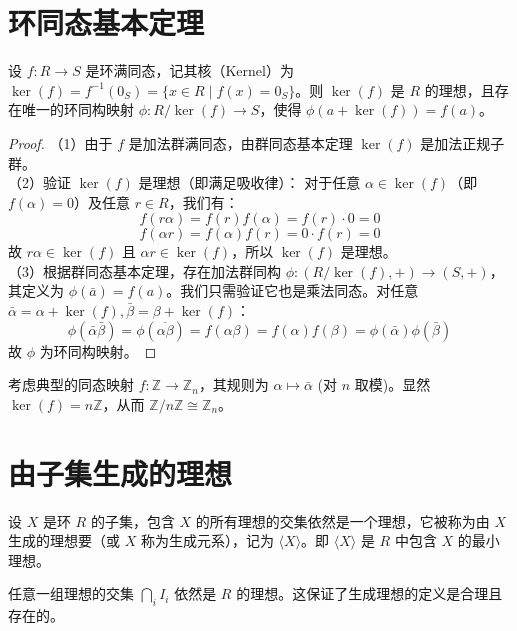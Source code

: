 \documentclass[11pt]{article}
\begin{document}
\section{环同态基本定理}

\begin{cntheorem}
设 $f: R \to S$ 是环满同态，记其核（Kernel）为 $\ker(f) = f^{-1}(0_S) = \{x \in R \mid f(x) = 0_S\}$。则 $\ker(f)$ 是 $R$ 的理想，且存在唯一的环同构映射 $\phi: R/\ker(f) \to S$，使得 $\phi(a + \ker(f)) = f(a)$。
\end{cntheorem}
\begin{proof}
（1）由于 $f$ 是加法群满同态，由群同态基本定理 $\ker(f)$ 是加法正规子群。\\
（2）验证 $\ker(f)$ 是理想（即满足吸收律）： 对于任意 $\alpha \in \ker(f)$（即 $f(\alpha)=0$）及任意 $r \in R$，我们有：
$$ f(r\alpha) = f(r)f(\alpha) = f(r) \cdot 0 = 0 $$
$$ f(\alpha r) = f(\alpha)f(r) = 0 \cdot f(r) = 0 $$
故 $r\alpha \in \ker(f)$ 且 $\alpha r \in \ker(f)$，所以 $\ker(f)$ 是理想。\\
（3）根据群同态基本定理，存在加法群同构 $\phi: (R/\ker(f), +) \to (S, +)$，其定义为 $\phi(\bar{a}) = f(a)$。我们只需验证它也是乘法同态。对任意 $\bar{\alpha} = \alpha + \ker(f), \bar{\beta} = \beta + \ker(f)$：
$$ \phi(\bar{\alpha}\bar{\beta}) = \phi(\overline{\alpha\beta}) = f(\alpha\beta) = f(\alpha)f(\beta) = \phi(\bar{\alpha})\phi(\bar{\beta}) $$
故 $\phi$ 为环同构映射。
\end{proof}

\begin{cnexample}
考虑典型的同态映射 $f: \mathbb{Z} \to \mathbb{Z}_n$，其规则为 $\alpha \mapsto \bar{\alpha}$ (对 $n$ 取模)。显然 $\ker(f) = n\mathbb{Z}$，从而 $\mathbb{Z}/n\mathbb{Z} \cong \mathbb{Z}_n$。
\end{cnexample}


\section{由子集生成的理想}

\begin{cndefinition}
设 $X$ 是环 $R$ 的子集，包含 $X$ 的所有理想的交集依然是一个理想，它被称为由 $X$ 生成的理想要（或 $X$ 称为生成元系），记为 $\langle X \rangle$。即 $\langle X \rangle$ 是 $R$ 中包含 $X$ 的最小理想。
\end{cndefinition}
\begin{cnproperty}
任意一组理想的交集 $\bigcap_{i} I_i$ 依然是 $R$ 的理想。这保证了生成理想的定义是合理且存在的。
\end{cnproperty}
\end{document}
